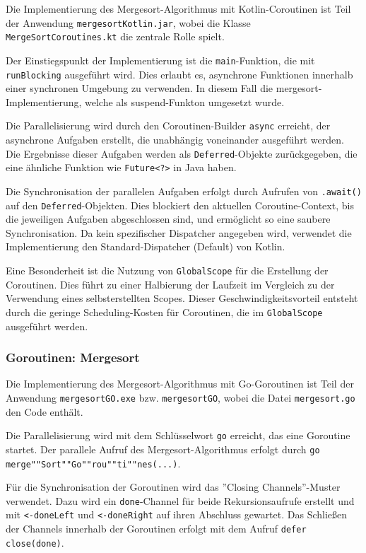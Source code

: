 \documentclass[fontsize=12pt,paper=a4,twoside=semi,parskip=half-,headsepline,headinclude]{scrreprt}
\begin{document}
Die Implementierung des Mergesort-Algorithmus mit Kotlin-Coroutinen ist Teil der Anwendung \texttt{mergesortKotlin.jar}, wobei die Klasse \texttt{MergeSortCoroutines.kt} die zentrale Rolle spielt.

Der Einstiegspunkt der Implementierung ist die \texttt{main}-Funktion, die mit \texttt{runBlocking} ausgeführt wird. Dies erlaubt es, asynchrone Funktionen innerhalb einer synchronen Umgebung zu verwenden. In diesem Fall die mergesort-Implementierung, welche als suspend-Funkton umgesetzt wurde.

Die Parallelisierung wird durch den Coroutinen-Builder \texttt{async} erreicht, der asynchrone Aufgaben erstellt, die unabhängig voneinander ausgeführt werden. Die Ergebnisse dieser Aufgaben werden als \texttt{Deferred}-Objekte zurückgegeben, die eine ähnliche Funktion wie \texttt{Future<?>} in Java haben.

Die Synchronisation der parallelen Aufgaben erfolgt durch Aufrufen von \texttt{.await()} auf den \texttt{Deferred}-Objekten. Dies blockiert den aktuellen Coroutine-Context, bis die jeweiligen Aufgaben abgeschlossen sind, und ermöglicht so eine saubere Synchronisation. Da kein spezifischer Dispatcher angegeben wird, verwendet die Implementierung den Standard-Dispatcher (Default) von Kotlin.

Eine Besonderheit ist die Nutzung von \texttt{GlobalScope} für die Erstellung der Coroutinen. Dies führt zu einer Halbierung der Laufzeit im Vergleich zu der Verwendung eines selbsterstellten Scopes. Dieser Geschwindigkeitsvorteil entsteht durch die geringe Scheduling-Kosten für Coroutinen, die im \texttt{GlobalScope} ausgeführt werden.

\subsubsection{Goroutinen: Mergesort}

Die Implementierung des Mergesort-Algorithmus mit Go-Goroutinen ist Teil der Anwendung \texttt{mergesortGO.exe} bzw. \texttt{mergesortGO}, wobei die Datei \texttt{mergesort.go} den Code enthält.

Die Parallelisierung wird mit dem Schlüsselwort \texttt{go} erreicht, das eine Goroutine startet. Der parallele Aufruf des Mergesort-Algorithmus erfolgt durch \texttt{go merge""Sort""Go""rou""ti""nes(...)}. 

Für die Synchronisation der Goroutinen wird das ''Closing Channels''-Muster verwendet. Dazu wird ein \texttt{done}-Channel für beide Rekursionsaufrufe erstellt und mit \texttt{<-doneLeft} und \texttt{<-doneRight} auf ihren Abschluss gewartet. Das Schließen der Channels innerhalb der Goroutinen erfolgt mit dem Aufruf \texttt{defer close(done)}.
\end{document}
